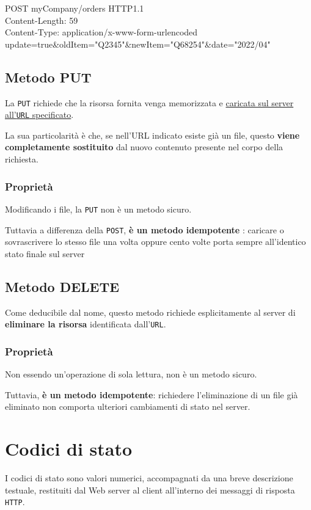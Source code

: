\begin{tcolorbox}[title=Esempio di POST]
\ttfamily
POST myCompany/orders HTTP1.1 \\
Content-Length: 59 \\
Content-Type: application/x-www-form-urlencoded \\
update=true\&oldItem="Q2345"\&newItem="Q68254"\&date="2022/04"
\end{tcolorbox}

\subsection{Metodo PUT}
La \texttt{PUT} richiede che la risorsa fornita venga memorizzata e \uline{caricata sul server all'\texttt{URL} specificato}.

La sua particolarità è che, se nell'URL indicato esiste già un file, questo \textbf{viene completamente sostituito} dal nuovo contenuto presente nel corpo della richiesta.

\subsubsection{Proprietà}
Modificando i file, la \texttt{PUT} non è un metodo sicuro.

Tuttavia a differenza della \texttt{POST}, \textbf{è un metodo idempotente} : caricare o sovrascrivere lo stesso file una volta oppure cento volte porta sempre all'identico stato finale sul server

\subsection{Metodo DELETE}
Come deducibile dal nome, questo metodo richiede esplicitamente al server di \textbf{eliminare la risorsa} identificata dall'\texttt{URL}.

\subsubsection{Proprietà}
Non essendo un'operazione di sola lettura, non è un metodo sicuro.

Tuttavia, \textbf{è un metodo idempotente}: richiedere l'eliminazione di un file già eliminato non comporta ulteriori cambiamenti di stato nel server.

\section{Codici di stato}
I codici di stato sono valori numerici, accompagnati da una breve descrizione testuale, restituiti dal Web server al client all'interno dei messaggi di risposta \texttt{HTTP}.

